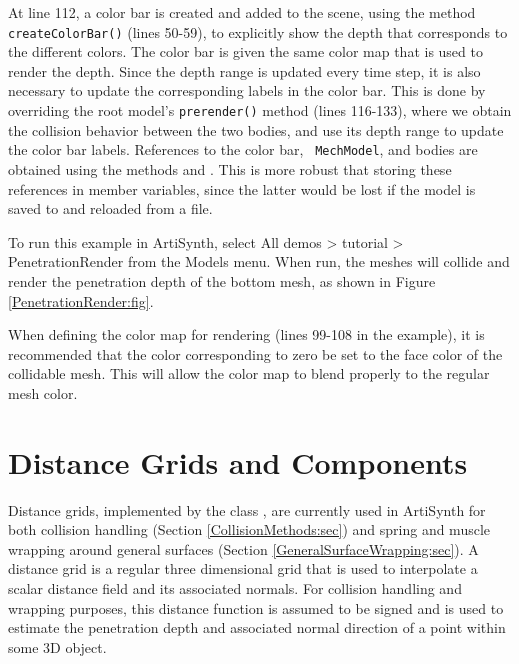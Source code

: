At line 112, a color bar is created and added to the scene, using the
method {\tt createColorBar()} (lines 50-59), to explicitly show the
depth that corresponds to the different colors. The color bar is given
the same color map that is used to render the depth. Since the depth
range is updated every time step, it is also necessary to update the
corresponding labels in the color bar. This is done by overriding the
root model's {\tt prerender()} method (lines 116-133), where we obtain
the collision behavior between the two bodies, and use its depth range
to update the color bar labels. References to the color bar, {\tt
MechModel}, and bodies are obtained using the
 methods
 and
.
This is more robust that storing these references in  member
variables, since the latter would be lost if the model is saved to and
reloaded from a file.

To run this example in ArtiSynth, select {\sf All demos > tutorial >
PenetrationRender} from the {\sf Models} menu. When run, the meshes
will collide and render the penetration depth of the bottom mesh, 
as shown in Figure \ref{PenetrationRender:fig}.

\begin{sideblock}
When defining the color map for rendering (lines 99-108 in the
example), it is recommended that the color corresponding to zero be
set to the face color of the collidable mesh.  This will allow
the color map to blend properly to the regular mesh color.
\end{sideblock}

\section{Distance Grids and Components}
\label{DistanceGrids:sec}

Distance grids, implemented by the class
, are currently used in
ArtiSynth for both collision handling (Section
\ref{CollisionMethods:sec}) and spring and muscle wrapping around
general surfaces (Section \ref{GeneralSurfaceWrapping:sec}).  A
distance grid is a regular three dimensional grid that is used to
interpolate a scalar distance field and its associated normals.
For collision handling and wrapping purposes, this distance function
is assumed to be signed and is used to estimate the penetration depth
and associated normal direction of a point within some 3D object.

